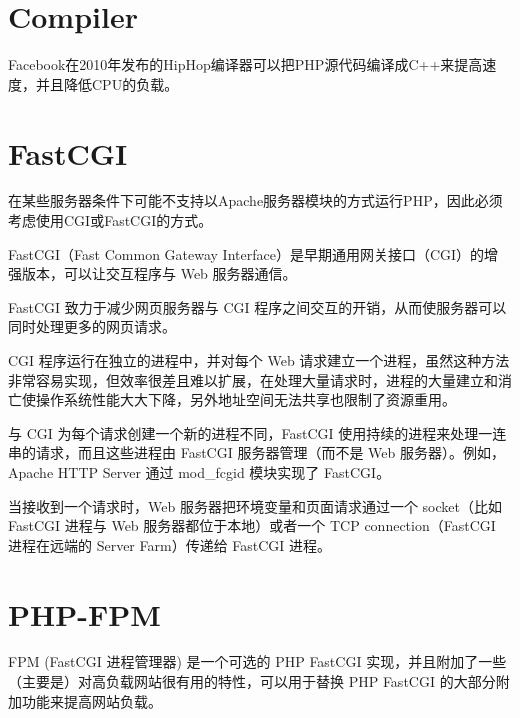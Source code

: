 \section{Compiler}



Facebook在2010年发布的HipHop编译器可以把PHP源代码编译成C++来提高速度，并且降低CPU的负载。






\section{FastCGI}


在某些服务器条件下可能不支持以Apache服务器模块的方式运行PHP，因此必须考虑使用CGI或FastCGI的方式。


FastCGI（Fast Common Gateway Interface）是早期通用网关接口（CGI）的增强版本，可以让交互程序与 Web 服务器通信。

FastCGI 致力于减少网页服务器与 CGI 程序之间交互的开销，从而使服务器可以同时处理更多的网页请求。

CGI 程序运行在独立的进程中，并对每个 Web 请求建立一个进程，虽然这种方法非常容易实现，但效率很差且难以扩展，在处理大量请求时，进程的大量建立和消亡使操作系统性能大大下降，另外地址空间无法共享也限制了资源重用。

与 CGI 为每个请求创建一个新的进程不同，FastCGI 使用持续的进程来处理一连串的请求，而且这些进程由 FastCGI 服务器管理（而不是 Web 服务器）。例如，Apache HTTP Server 通过 mod\_fcgid 模块实现了 FastCGI。

当接收到一个请求时，Web 服务器把环境变量和页面请求通过一个 socket（比如FastCGI 进程与 Web 服务器都位于本地）或者一个 TCP connection（FastCGI 进程在远端的 Server Farm）传递给 FastCGI 进程。

\section{PHP-FPM}

FPM (FastCGI 进程管理器) 是一个可选的 PHP FastCGI 实现，并且附加了一些（主要是）对高负载网站很有用的特性，可以用于替换 PHP FastCGI 的大部分附加功能来提高网站负载。

